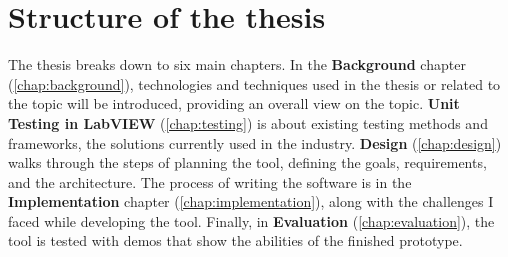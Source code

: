 \section{Structure of the thesis}
The thesis breaks down to six main chapters. In the \textbf{Background} chapter (\autoref{chap:background}), technologies and techniques used in the thesis or related to the topic will be introduced, providing an overall view on the topic. \textbf{Unit Testing in LabVIEW} (\autoref{chap:testing}) is about existing testing methods and frameworks, the solutions currently used in the industry. \textbf{Design} (\autoref{chap:design}) walks through the steps of planning the tool, defining the goals, requirements, and the architecture. The process of writing the software is in the \textbf{Implementation} chapter (\autoref{chap:implementation}), along with the challenges I faced while developing the tool. Finally, in \textbf{Evaluation} (\autoref{chap:evaluation}), the tool is tested with demos that show the abilities of the finished prototype.
\pagebreak